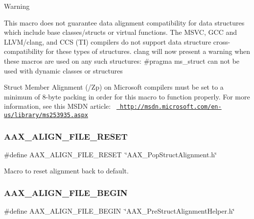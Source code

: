 \begin{DoxyWarning}{Warning}
\begin{DoxyItemize}
\item This macro does not guarantee data alignment compatibility for data structures which include base classes/structs or virtual functions. The M\+S\+VC, G\+CC and L\+L\+V\+M/clang, and C\+CS (TI) compilers do not support data structure cross-\/compatibility for these types of structures. clang will now present a warning when these macros are used on any such structures\+: {\ttfamily \#pragma ms\+\_\+struct can not be used with dynamic classes or structures} \item Struct Member Alignment (/\+Zp) on Microsoft compilers must be set to a minimum of 8-\/byte packing in order for this macro to function properly. For more information, see this M\+S\+DN article\+:~\newline
\href{http://msdn.microsoft.com/en-us/library/ms253935.aspx}{\texttt{ http\+://msdn.\+microsoft.\+com/en-\/us/library/ms253935.\+aspx}} \end{DoxyItemize}

\end{DoxyWarning}
\mbox{\label{a00392_a8aaaefcc3d87025e84d5ccb99b650a87}} 
\subsubsection{\texorpdfstring{AAX\_ALIGN\_FILE\_RESET}{AAX\_ALIGN\_FILE\_RESET}}
{\footnotesize\ttfamily \#define A\+A\+X\+\_\+\+A\+L\+I\+G\+N\+\_\+\+F\+I\+L\+E\+\_\+\+R\+E\+S\+ET~\char`\"{}A\+A\+X\+\_\+\+Pop\+Struct\+Alignment.\+h\char`\"{}}



Macro to reset alignment back to default. 

\mbox{\label{a00392_adda336497ac4b6d43d00b27c6d8f4b0c}} 
\subsubsection{\texorpdfstring{AAX\_ALIGN\_FILE\_BEGIN}{AAX\_ALIGN\_FILE\_BEGIN}}
{\footnotesize\ttfamily \#define A\+A\+X\+\_\+\+A\+L\+I\+G\+N\+\_\+\+F\+I\+L\+E\+\_\+\+B\+E\+G\+IN~\char`\"{}A\+A\+X\+\_\+\+Pre\+Struct\+Alignment\+Helper.\+h\char`\"{}}



